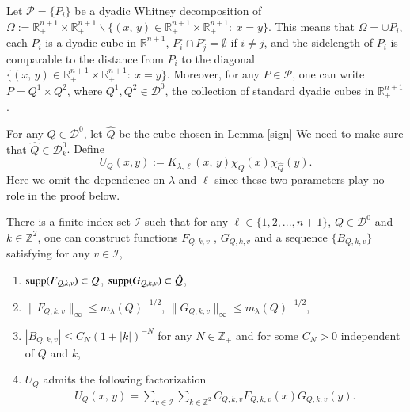 \documentclass[12pt]{amsart}
\begin{document}
Let $\mathcal{P}=\{P_i\}$ be a dyadic Whitney decomposition of $\Omega:=\mathbb{R}_+^{n+1}\times\mathbb{R}_+^{n+1}\backslash \{(x,\,y)\in\mathbb{R}_+^{n+1}\times \mathbb{R}_+^{n+1}:\ x=y\}$. This means that $\Omega=\cup P_i$, each $P_i$ is a dyadic cube in $\mathbb{R}_+^{n+1}$, $P_i^\circ\cap P_j^\circ=\emptyset$ if $i\neq j$, and the sidelength of $P_i$ is comparable to the distance from $P_i$ to the diagonal $\{(x,\,y)\in\mathbb{R}_+^{n+1}\times \mathbb{R}_+^{n+1}:\ x=y\}$. Moreover, for any $P\in\mathcal{P}$, one can write $P=Q^1\times Q^2$, where $Q^1,Q^2\in\mathcal{D}^0$, the collection of standard dyadic cubes in $\mathbb{R}_+^{n+1}$.

For any $Q\in\mathcal{D}^0$, {\color{red}let $\hat{Q}$ be the cube chosen in Lemma \ref{sign}} {\color{red}We need to make sure that $\hat{Q}\in\mathcal{D}_k^0$}. Define
$$U_{Q}(x,y):=K_{\lambda,\ell}(x,\,y)\chi_Q(x)\chi_{\hat{Q}}(y).$$
Here we omit the dependence on $\lambda$ and $\ell$ since these two parameters play no role in the proof below.
\begin{lemma}\label{jq}
There is a finite index set $\mathcal{I}$ such that
for any $\ell\in\{1,2,...,n+1\}$, $Q\in\mathcal{D}^0$ and $k\in\mathbb{Z}^2$, one can construct  functions $F_{Q,k,v}$ , $G_{Q,k,v}$ and a sequence $\{B_{Q,k,v}\}$ satisfying for any $v\in\mathcal{I}$,
\begin{enumerate}
  \item ${\rm supp}(F_{Q,k,v})\subset Q$, ${\rm supp}(G_{Q,k,v})\subset \hat{Q}$,
  \item $\|F_{Q,k,v}\|_{\infty}\leq m_\lambda(Q)^{-1/2}$, $\|G_{Q,k,v}\|_{\infty}\leq m_\lambda(Q)^{-1/2}$,
  \item $|B_{Q,k,v}|\leq C_N(1+|k|)^{-N}$ for any $N\in\mathbb{Z}_+$ and for some $C_N>0$ independent of  $Q$ and $k$,
\item $U_{Q}$ admits the following factorization
\begin{align*}
U_{Q}(x,\,y)=\sum_{v\in\mathcal{I}}\sum_{k\in\mathbb{Z}^2}C_{Q,k,v}F_{Q,k,v}(x)G_{Q,k,v}(y).
\end{align*}
\end{enumerate}
\end{lemma}
\end{document}
